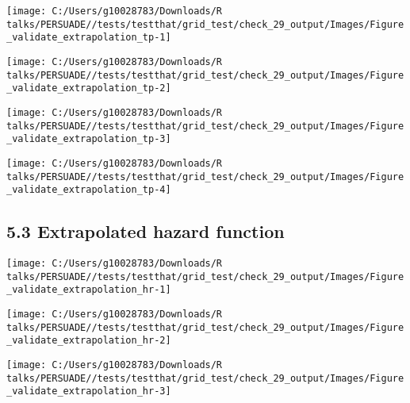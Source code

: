 \documentclass[
]{article}
\begin{document}
\begin{flushleft}\texttt{[image: C:/Users/g10028783/Downloads/R talks/PERSUADE//tests/testthat/grid\_test/check\_29\_output/Images/Figure\_validate\_extrapolation\_tp-1]} \end{flushleft}

\begin{flushleft}\texttt{[image: C:/Users/g10028783/Downloads/R talks/PERSUADE//tests/testthat/grid\_test/check\_29\_output/Images/Figure\_validate\_extrapolation\_tp-2]} \end{flushleft}

\begin{flushleft}\texttt{[image: C:/Users/g10028783/Downloads/R talks/PERSUADE//tests/testthat/grid\_test/check\_29\_output/Images/Figure\_validate\_extrapolation\_tp-3]} \end{flushleft}

\begin{flushleft}\texttt{[image: C:/Users/g10028783/Downloads/R talks/PERSUADE//tests/testthat/grid\_test/check\_29\_output/Images/Figure\_validate\_extrapolation\_tp-4]} \end{flushleft}

\clearpage

\subsection{5.3 Extrapolated hazard
function}\label{extrapolated-hazard-function}

\begin{flushleft}\texttt{[image: C:/Users/g10028783/Downloads/R talks/PERSUADE//tests/testthat/grid\_test/check\_29\_output/Images/Figure\_validate\_extrapolation\_hr-1]} \end{flushleft}

\begin{flushleft}\texttt{[image: C:/Users/g10028783/Downloads/R talks/PERSUADE//tests/testthat/grid\_test/check\_29\_output/Images/Figure\_validate\_extrapolation\_hr-2]} \end{flushleft}

\begin{flushleft}\texttt{[image: C:/Users/g10028783/Downloads/R talks/PERSUADE//tests/testthat/grid\_test/check\_29\_output/Images/Figure\_validate\_extrapolation\_hr-3]} \end{flushleft}
\end{document}
